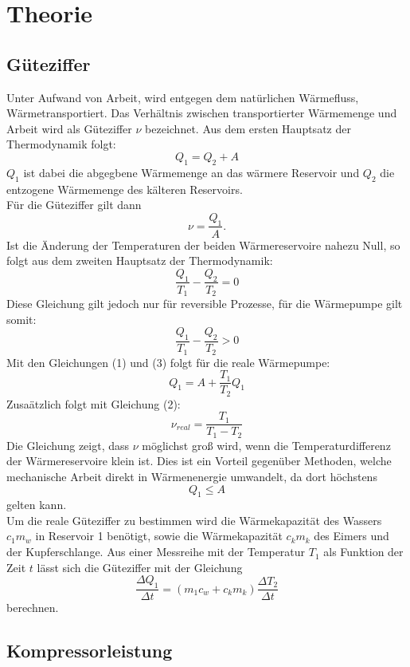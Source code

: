\section{Theorie}
\subsection{Güteziffer}
Unter Aufwand von Arbeit, wird entgegen dem natürlichen Wärmefluss, Wärmetransportiert.
Das Verhältnis zwischen transportierter Wärmemenge und Arbeit wird als Güteziffer $\nu$
bezeichnet. Aus dem ersten Hauptsatz der Thermodynamik folgt:
\begin{equation}
  Q_1 = Q_2 + A
\end{equation}
$Q_1$ ist dabei die abgegbene Wärmemenge an das wärmere Reservoir und $Q_2$ die
entzogene Wärmemenge des kälteren Reservoirs. \\
Für die Güteziffer gilt dann
\begin{equation}
  \nu = \frac{Q_1}{A} .
\end{equation}
Ist die Änderung der Temperaturen der beiden Wärmereservoire nahezu Null, so folgt
aus dem zweiten Hauptsatz der Thermodynamik:
\begin{equation}
  \frac{Q_1}{T_1} - \frac{Q_2}{T_2} = 0
\end{equation}
Diese Gleichung gilt jedoch nur für reversible Prozesse, für die Wärmepumpe gilt somit:
\begin{equation}
  \frac{Q_1}{T_1} - \frac{Q_2}{T_2} > 0
\end{equation}
Mit den Gleichungen (1) und (3) folgt für die reale Wärmepumpe:
\begin{equation}
  Q_1 = A + \frac{T_1}{T_2}Q_1
\end{equation}
Zusaätzlich folgt mit Gleichung (2):
\begin{equation}
  \nu_{real} = \frac{T_1}{T_1 - T_2}
\end{equation}
Die Gleichung zeigt, dass $\nu$ möglichst groß wird, wenn die Temperaturdifferenz
der Wärmereservoire klein ist. Dies ist ein Vorteil gegenüber Methoden, welche
mechanische Arbeit direkt in Wärmenenergie umwandelt, da dort höchstens
\begin{equation}
  Q_1 \leq A
\end{equation}
gelten kann. \\
Um die reale Güteziffer zu bestimmen wird die Wärmekapazität des Wassers $c_1m_w$ in Reservoir 1 benötigt,
sowie die Wärmekapazität $c_km_k$ des Eimers und der Kupferschlange. Aus einer Messreihe mit der Temperatur
$T_1$ als Funktion der Zeit $t$ lässt sich die Güteziffer mit der Gleichung
\begin{equation}
  \frac{\Delta Q_1}{\Delta t} = (m_1 c_w+ c_k m_k) \frac{\Delta T_2}{\Delta t}
\end{equation}
berechnen.
\subsection{Kompressorleistung}

\label{sec:Theorie}

\cite{sample}
